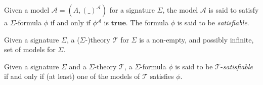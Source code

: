 \begin{definition}[Satisfiability]
  Given a model $\mathcal{A} = (A, (\_)^{\mathcal{A}})$ for a signature
  $\Sigma{}$, the model $\mathcal{A}$ is said to satisfy a $\Sigma{}$-formula
  $\phi{}$ if and only if $\phi{}^{\mathcal{A}}$ is $\mathbf{true}$.
  The formula $\phi{}$ is said to be \textit{satisfiable}.
\end{definition}



\begin{definition}[Theory]\label{def:theory}
  Given a signature $\Sigma{}$, a ($\Sigma{}$-)theory $\mathcal{T}$ for
  $\Sigma{}$ is a non-empty, and possibly infinite, set of models for $\Sigma{}$.
\end{definition}

\begin{definition}
  Given a signature $\Sigma{}$ and a $\Sigma{}$-theory $\mathcal{T}$, a
  $\Sigma{}$-formula $\phi{}$ is said to be $\mathcal{T}$-\textit{satisfiable}
  if and only if (at least) one of the models of $\mathcal{T}$ satisfies
  $\phi{}$.
\end{definition}






